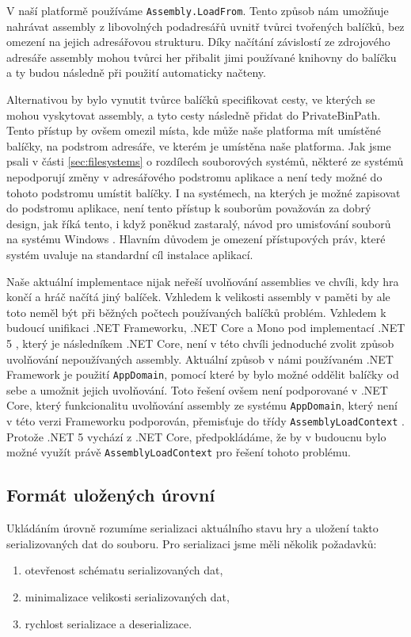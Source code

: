V naší platformě používáme \texttt{Assembly.LoadFrom}. Tento způsob nám umožňuje nahrávat assembly z libovolných podadresářů uvnitř tvůrci tvořených balíčků, bez omezení na jejich adresářovou strukturu. Díky načítání závislostí ze zdrojového adresáře assembly mohou tvůrci her přibalit jimi používané knihovny do balíčku a ty budou následně při použití automaticky načteny.

Alternativou by bylo vynutit tvůrce balíčků specifikovat cesty, ve kterých se mohou vyskytovat assembly, a tyto cesty následně přidat do PrivateBinPath. Tento přístup by ovšem omezil místa, kde může naše platforma mít umístěné balíčky, na podstrom adresáře, ve kterém je umístěna naše platforma. Jak jsme psali v části \ref{sec:filesystems} o rozdílech souborových systémů, některé ze systémů nepodporují změny v adresářového podstromu aplikace a není tedy možné do tohoto podstromu umístit balíčky. I na systémech, na kterých je možné zapisovat do podstromu aplikace, není tento přístup k souborům považován za dobrý design, jak říká tento, i když poněkud zastaralý, návod pro umisťování souborů na systému Windows \citep{site:windowsappfiles}. Hlavním důvodem je omezení přístupových práv, které systém uvaluje na standardní cíl instalace aplikací.

Naše aktuální implementace nijak neřeší uvolňování assemblies ve chvíli, kdy hra končí a hráč načítá jiný balíček. Vzhledem k velikosti assembly v paměti by ale toto neměl být při běžných počtech používaných balíčků problém. Vzhledem k budoucí unifikaci .NET Frameworku, .NET Core a Mono pod implementací .NET 5 \citep{site:dotnet5}, který je následníkem .NET Core, není v této chvíli jednoduché zvolit způsob uvolňování nepoužívaných assembly. Aktuální způsob v námi používaném .NET Framework je použití \texttt{AppDomain}, pomocí které by bylo možné oddělit balíčky od sebe a umožnit jejich uvolňování. Toto řešení ovšem není podporované v .NET Core, který funkcionalitu uvolňování assembly ze systému \texttt{AppDomain}, který není v této verzi Frameworku podporován, přemisťuje do třídy \texttt{AssemblyLoadContext} \citep{site:assloadcontext}. Protože .NET 5 vychází z .NET Core, předpokládáme, že by v budoucnu bylo možné využít právě \texttt{AssemblyLoadContext} pro řešení tohoto problému. 

\subsection{Formát uložených úrovní}
Ukládáním úrovně rozumíme serializaci aktuálního stavu hry a uložení takto serializovaných dat do souboru. Pro serializaci jsme měli několik požadavků: 
\begin{enumerate}
	\item otevřenost schématu serializovaných dat,
	\item minimalizace velikosti serializovaných dat,
	\item rychlost serializace a deserializace.
\end{enumerate}


